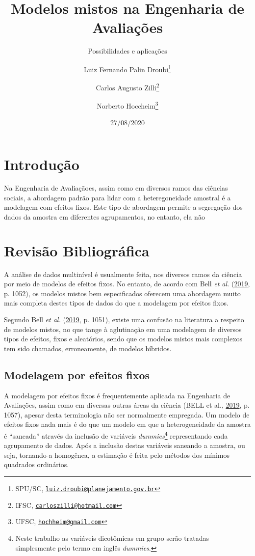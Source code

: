 \documentclass[
  a4paper, 12pt]{article}
\title{Modelos mistos na Engenharia de Avaliações}
\subtitle{Possibilidades e aplicações}
\author{Luiz Fernando Palin Droubi\footnote{SPU/SC,
  \href{mailto:luiz.droubi@planejamento.gov.br}{\nolinkurl{luiz.droubi@planejamento.gov.br}}} \and Carlos Augusto Zilli\footnote{IFSC,
  \href{mailto:carloszilli@hotmail.com}{\nolinkurl{carloszilli@hotmail.com}}} \and Norberto Hoccheim\footnote{UFSC,
  \href{mailto:hochheim@gmail.com}{\nolinkurl{hochheim@gmail.com}}}}
\date{27/08/2020}
\begin{document}
\maketitle

\hypertarget{introduuxe7uxe3o}{%
\section{Introdução}\label{introduuxe7uxe3o}}

Na Engenharia de Avaliaçãoes, assim como em diversos ramos das ciências
sociais, a abordagem padrão para lidar com a heteregoneidade amostral é
a modelagem com efeitos fixos. Este tipo de abordagem permite a
segregação dos dados da amostra em diferentes agrupamentos, no entanto,
ela não

\hypertarget{revisuxe3o-bibliogruxe1fica}{%
\section{Revisão Bibliográfica}\label{revisuxe3o-bibliogruxe1fica}}

A análise de dados multinível é usualmente feita, nos diversos ramos da
ciência por meio de modelos de efeitos fixos. No entanto, de acordo com
Bell \emph{et al.} (\protect\hyperlink{ref-bell2019}{2019}, p. 1052), os
modelos mistos bem especificados oferecem uma abordagem muito mais
completa destes tipos de dados do que a modelagem por efeitos fixos.

Segundo Bell \emph{et al.} (\protect\hyperlink{ref-bell2019}{2019}, p.
1051), existe uma confusão na literatura a respeito de modelos mistos,
no que tange à aglutinação em uma modelagem de diversos tipos de
efeitos, fixos e aleatórios, sendo que os modelos mistos mais complexos
tem sido chamados, erroneamente, de modelos híbridos.

\hypertarget{modelagem-por-efeitos-fixos}{%
\subsection{Modelagem por efeitos
fixos}\label{modelagem-por-efeitos-fixos}}

A modelagem por efeitos fixos é frequentemente aplicada na Engenharia de
Avaliações, assim como em diversas outras áreas da ciência (BELL et al.,
\protect\hyperlink{ref-bell2019}{2019}, p. 1057), apesar desta
terminologia não ser normalmente empregada. Um modelo de efeitos fixos
nada mais é do que um modelo em que a heterogeneidade da amostra é
``saneada'' através da inclusão de variáveis \emph{dummies}\footnote{Neste
  trabalho as variáveis dicotômicas em grupo serão tratadas simplesmente
  pelo termo em inglês \emph{dummies}.} representando cada agrupamento
de dados. Após a inclusão destas variáveis saneando a amostra, ou seja,
tornando-a homogênea, a estimação é feita pelo métodos dos mínimos
quadrados ordinários.
\end{document}

